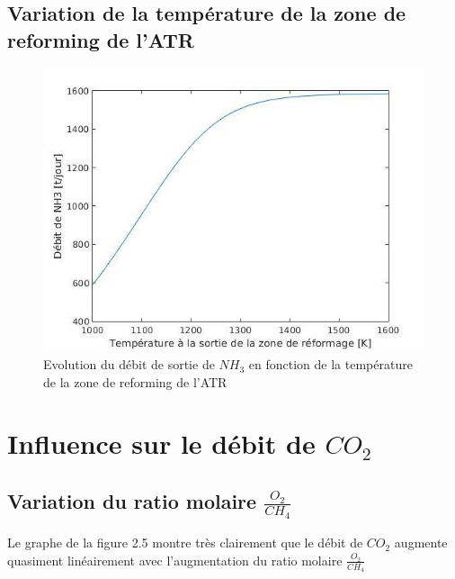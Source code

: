 \documentclass[12pt]{report}
\begin{document}
\subsection{Variation de la température de la zone de reforming de l'ATR}

\begin{figure}[H]
\begin{center}
\includegraphics[scale=0.6]{debit_NH3_Temperature}
\caption{Evolution du débit de sortie de $NH_3$ en fonction de la température de la zone de reforming de l'ATR}
\end{center}
\end{figure}



\section{Influence sur le débit de $CO_2$}

\subsection{Variation du ratio molaire $\frac{O_2}{CH_4}$}

Le graphe de la figure 2.5 montre très clairement que le débit de $CO_2$ augmente quasiment linéairement avec l'augmentation du ratio molaire $\frac{O_2}{CH_4}$
\end{document}
